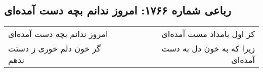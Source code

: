 \begin{center}
\section*{رباعی شماره ۱۷۶۶: امروز ندانم بچه دست آمده‌ای}
\label{sec:1766}
\begin{longtable}{l p{0.5cm} r}
امروز ندانم بچه دست آمده‌ای
&&
کز اول بامداد مست آمده‌ای
\\
گر خون دلم خوری ز دستت ندهم
&&
زیرا که به خون دل به دست آمده‌ای
\\
\end{longtable}
\end{center}
